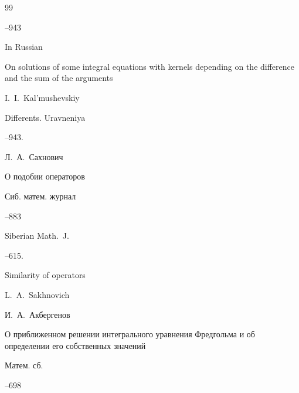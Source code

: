 \begin{thebibliography}{99}



--943


\misctransl

\lang In Russian

\paper On solutions of some integral equations with kernels depending on the difference and the sum of the arguments

\by I.~I.~Kal'mushevskiy

\jour Differents. Uravneniya




--943.






\by Л.~А.~Сахнович

\paper О подобии операторов

\jour Сиб. матем. журнал




--883

\transl

\jour Siberian Math.~J.




--615.

\paper Similarity of operators

\by L.~A.~Sakhnovich









\by И.~А.~Акбергенов

\paper О приближенном решении интегрального уравнения Фредгольма и об определении его собственных значений

\jour Матем. сб.




--698


\end{thebibliography}
